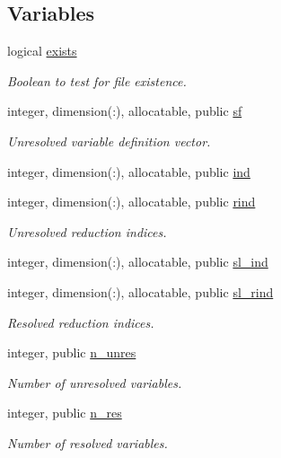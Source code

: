 \subsection*{Variables}
\begin{DoxyCompactItemize}
\item 
logical \hyperlink{namespacesf__def_a4461dcde80d3a5a5d53bb45e55839b5d}{exists}
\begin{DoxyCompactList}\small\item\em Boolean to test for file existence. \end{DoxyCompactList}\item 
integer, dimension(\+:), allocatable, public \hyperlink{namespacesf__def_ad000452ff3b9c4c5ce070c04d0521b52}{sf}
\begin{DoxyCompactList}\small\item\em Unresolved variable definition vector. \end{DoxyCompactList}\item 
integer, dimension(\+:), allocatable, public \hyperlink{namespacesf__def_a5e294b6f015b0b0499c9cee47da37627}{ind}
\item 
integer, dimension(\+:), allocatable, public \hyperlink{namespacesf__def_a2befe00671a3add2d8049605682bcd52}{rind}
\begin{DoxyCompactList}\small\item\em Unresolved reduction indices. \end{DoxyCompactList}\item 
integer, dimension(\+:), allocatable, public \hyperlink{namespacesf__def_a6b226546e7059222fad5500946c1c550}{sl\+\_\+ind}
\item 
integer, dimension(\+:), allocatable, public \hyperlink{namespacesf__def_aab6ba7881cef9b469ab9d9323f3fcbea}{sl\+\_\+rind}
\begin{DoxyCompactList}\small\item\em Resolved reduction indices. \end{DoxyCompactList}\item 
integer, public \hyperlink{namespacesf__def_a1e03f6f31a13f2bfa8e84dd69874b8aa}{n\+\_\+unres}
\begin{DoxyCompactList}\small\item\em Number of unresolved variables. \end{DoxyCompactList}\item 
integer, public \hyperlink{namespacesf__def_af05cacb04c0c2d10c9405e71db633a43}{n\+\_\+res}
\begin{DoxyCompactList}\small\item\em Number of resolved variables. \end{DoxyCompactList}\item 

\end{DoxyCompactItemize}
